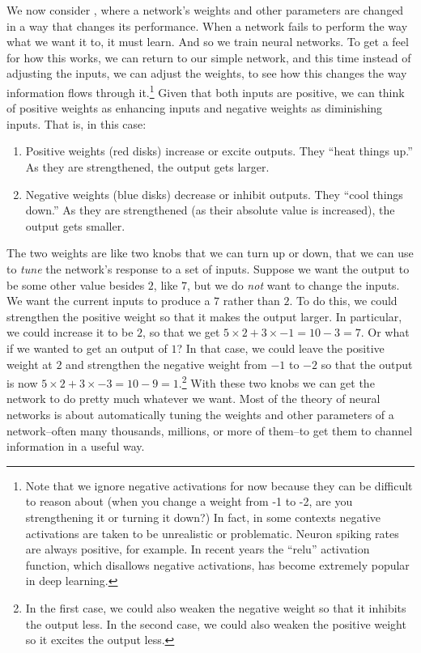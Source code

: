 We now consider , where a network's weights and other parameters are changed in a way that changes its performance. When a network fails to perform the way what we want it to, it must learn. And so we train neural networks. To get a feel for how this works, we can return to our simple network, and this time instead of adjusting the inputs, we can adjust the weights, to see how this changes the way information flows through it.\footnote{Note that we ignore negative activations for now because they can be difficult to reason about (when you change a weight from -1 to -2, are you strengthening it or turning it down?) In fact, in some contexts negative activations are taken to be unrealistic or problematic. Neuron spiking rates are always positive, for example. In recent years the ``relu'' activation function, which disallows negative activations, has become extremely popular in deep learning.} Given that both inputs are positive, we can think of positive weights as enhancing inputs and negative weights as diminishing inputs. That is, in this case:
\begin{enumerate}
\item  Positive weights (red disks) increase or excite outputs. They ``heat things up.'' As they are strengthened, the output gets larger.
\item  Negative weights (blue disks) decrease or inhibit outputs. They ``cool things down.'' As they are strengthened (as their absolute value is increased), the output gets smaller.
\end{enumerate}
The two weights are like two knobs that we can turn up or down, that we can use to \emph{tune} the network's response to a set of inputs. Suppose we want the output to be some other value besides $2$, like $7$, but we do \emph{not} want to change the inputs. We want the current inputs to produce a $7$ rather than $2$. To do this, we could strengthen the positive weight so that it makes the output larger. In particular, we could increase it to be $2$, so that we get $5 \times 2 + 3 \times -1 = 10 - 3 = 7$.  Or what if we wanted to get an output of $1$? In that case, we could leave the positive weight at $2$ and strengthen the negative weight from $-1$ to $-2$ so that the output is now $5 \times 2 + 3 \times -3 = 10 - 9 = 1$.\footnote{In the first case, we could also weaken the negative weight so that it inhibits the output less. In the second case, we could also weaken the positive weight so it excites the output less.} With these two knobs we can get the network to do pretty much whatever we want. Most of the theory of neural networks is about automatically tuning the weights and other parameters of a network--often many thousands, millions, or more of them--to get them to channel information in a useful way.

